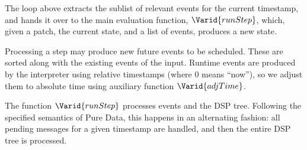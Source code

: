 \resethooks

The loop above extracts the sublist of relevant events for the current
timestamp, and hands it over to the main evaluation function, \ensuremath{\Varid{runStep}},
which, given a patch, the current state, and a list of events, produces
a new state.

Processing a step may produce new future events to be scheduled. These are
sorted along with the existing events of the input. Runtime events are
produced by the interpreter using relative timestamps (where 0 means ``now''),
so we adjust them to absolute time using auxiliary function \ensuremath{\Varid{adjTime}}.

The function \ensuremath{\Varid{runStep}} processes events and the DSP tree. Following the
specified semantics of Pure Data, this happens in an alternating fashion: all
pending messages for a given timestamp are handled, and then the entire DSP
tree is processed.

